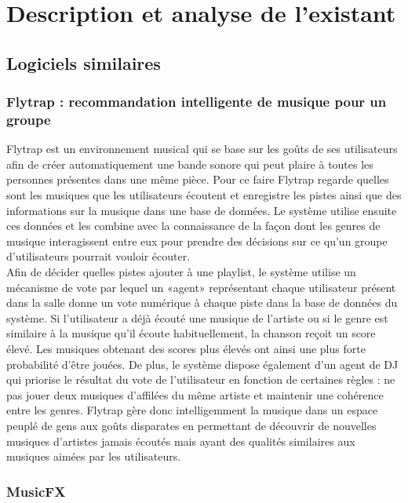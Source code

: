 \documentclass[12pt, openany]{report}
\begin{document}
\section{Description et analyse de l'existant}

\subsection{Logiciels similaires}

\subsubsection{Flytrap : recommandation intelligente de musique pour un groupe}

Flytrap \cite {Flytrap} est un environnement musical qui se base sur les goûts de ses utilisateurs afin de  créer automatiquement une bande sonore qui peut plaire à toutes les personnes présentes dans une même pièce. Pour ce faire Flytrap regarde quelles sont les musiques que les utilisateurs écoutent et enregistre les pistes ainsi que des informations sur la musique dans une base de données. Le système utilise ensuite ces données et les combine avec la connaissance de la façon dont les genres de musique interagissent  entre eux pour prendre des décisions sur ce qu’un groupe d’utilisateurs pourrait vouloir écouter. \\
Afin de décider quelles pistes ajouter à une playlist, le système utilise un mécanisme de vote par lequel un «agent» représentant chaque utilisateur présent dans la salle donne un vote numérique à chaque piste dans la base de données du système. Si l’utilisateur a déjà écouté une musique de l’artiste ou si le genre est similaire à la musique qu’il écoute habituellement, la chanson reçoit un score élevé. Les musiques obtenant des scores plus élevés ont ainsi une plus forte probabilité d’être jouées. De plus, le système dispose également d’un agent de DJ qui priorise le résultat du vote de l’utilisateur en fonction de certaines règles : ne pas jouer deux musiques d’affilées du même artiste et maintenir une cohérence entre les genres. Flytrap gère donc intelligemment la musique dans un espace peuplé de gens aux goûts disparates en permettant de découvrir de nouvelles musiques d’artistes jamais écoutés mais ayant des qualités similaires aux musiques aimées par les utilisateurs.

\subsubsection{MusicFX}
\end{document}
